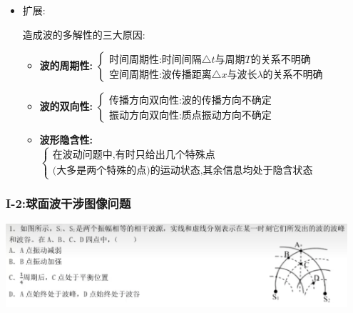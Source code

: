 \documentclass{article}
\begin{document}
\begin{itemize}
    \item 扩展:\quad

          造成波的多解性的三大原因:
          \begin{itemize}
              \item \textbf{波的周期性:}\hspace{1em}
                    $\begin{cases}
                            \text{时间周期性:时间间隔}\triangle t \text{与周期} T \text{的关系不明确} \\
                            \text{空间周期性:波传播距离}\triangle x \text{与波长} \lambda \text{的关系不明确}
                        \end{cases}$

              \item \textbf{波的双向性:}\hspace{1em}
                    $\begin{cases}
                            \text{传播方向双向性:波的传播方向不确定} \\
                            \text{振动方向双向性:质点振动方向不确定}
                        \end{cases}$

              \item \textbf{波形隐含性:}\hspace{1em}
                    $\begin{cases}
                            \text{在波动问题中,有时只给出几个特殊点} \\
                            \text{(大多是两个特殊的点)的运动状态,其余信息均处于隐含状态}
                        \end{cases}$
          \end{itemize}

\end{itemize}

\vspace{2em}

\subsubsection{I-2:球面波干涉图像问题}
\includegraphics[width = 0.95\textwidth]{./pictures/2.1-1.png}
\end{document}

